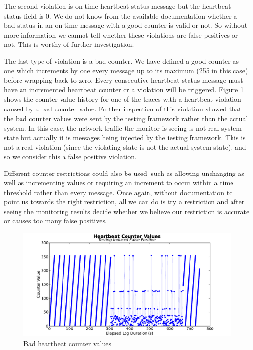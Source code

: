 The second violation is on-time heartbeat status message but the heartbeat status field is 0. 
We do not know from the available documentation whether a bad status in an on-time message with a good counter is valid or not. So without more information we cannot tell whether these violations are false positives or not. This is worthy of further investigation.

The last type of violation is a bad counter. 
We have defined a good counter as one which increments by one every message up to its maximum (255 in this case) before wrapping back to zero.
Every consecutive heartbeat status message must have an incremented heartbeat counter or a violation will be triggered. Figure \ref{fig:eval:hb_badcounter} shows the counter value history for one of the traces with a heartbeat violation caused by a bad counter value.
%
Further inspection of this violation showed that the bad counter values were sent by the testing framework rather than the actual system. In this case, the network traffic the monitor is seeing is not real system state but actually it is messages being injected by the testing framework. This is not a real violation (since the violating state is not the actual system state), and so we consider this a false positive violation.

Different counter restrictions could also be used, such as allowing unchanging as well as incrementing values or requiring an increment to occur within a time threshold rather than every message. Once again, without documentation to point us towards the right restriction, all we can do is try a restriction and after seeing the monitoring results decide whether we believe our restriction is accurate or causes too many false positives. 
\begin{figure}
\includegraphics[width=4.5in]{img/hb2}
\caption{Bad heartbeat counter values \label{fig:eval:hb_badcounter}}
\end{figure}

